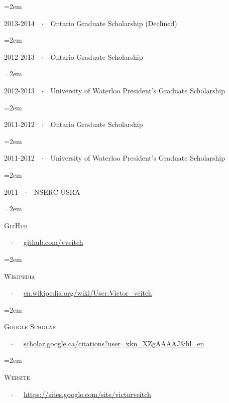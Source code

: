 \documentclass{scrartcl}
\newcommand{\MarginText}[1]{\marginpar{\raggedleft\itshape\small#1}} %
\newcommand{\Description}[1]{\hangindent=2em\hangafter=0\noindent\raggedright\footnotesize{#1}\par\normalsize\vspace{1em}} %
\begin{document}
\begin{cv}{}
\Description{2013-2014\ \ $\cdotp$\ \ Ontario Graduate Scholarship (Declined)}


\vspace{-0.5em} %

\Description{2012-2013\ \ $\cdotp$\ \ Ontario Graduate Scholarship}


\vspace{-0.5em} %

\Description{2012-2013\ \ $\cdotp$\ \ University of Waterloo President's Graduate Scholarship}


\vspace{-0.5em} %

\Description{2011-2012\ \ $\cdotp$\ \ Ontario Graduate Scholarship}


\vspace{-0.5em} %

\Description{2011-2012\ \ $\cdotp$\ \ University of Waterloo President's Graduate Scholarship}

\vspace{-0.5em} %

\Description{2011\ \ $\cdotp$\ \ NSERC USRA}

\newpage
\vspace{1em}

\newlength{\langbox} %
\settowidth{\langbox}{google scholar} %

\Description{\MarginText{Web}\parbox{\langbox}{\textsc{GitHub}}\ \ $\cdotp$\ \ \ \href{https://github.com/vveitch}{github.com/vveitch}}
\Description{\parbox{\langbox}{\textsc{Wikipedia}}\ \ $\cdotp$\ \ \ \href{https://en.wikipedia.org/wiki/User:Victor_veitch}{en.wikipedia.org/wiki/User:Victor\_veitch}}
\Description{\parbox{\langbox}{\textsc{Google Scholar}}\ \ $\cdotp$\ \ \ \href{https://scholar.google.ca/citations?user=xkn_XZgAAAAJ&hl=en}{scholar.google.ca/citations?user=xkn\_XZgAAAAJ\&hl=en}}
\Description{\parbox{\langbox}{\textsc{Website}}\ \ $\cdotp$\ \ \ \href{https://sites.google.com/site/victorveitch}{https://sites.google.com/site/victorveitch}}
\end{cv}
\end{document}
